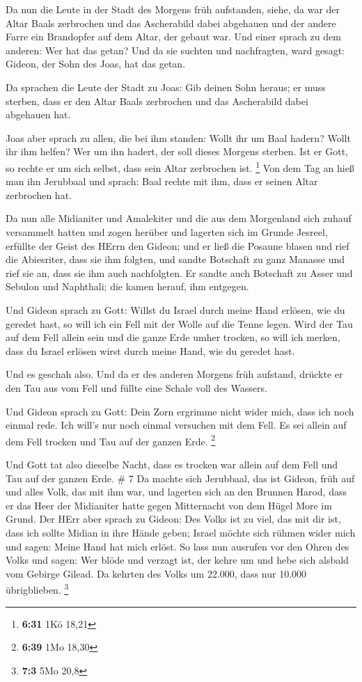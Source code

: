  Da nun die Leute in der Stadt des Morgens früh aufstanden,
siehe, da war der Altar Baals zerbrochen und das Ascherabild dabei
abgehauen und der andere Farre ein Brandopfer auf dem Altar, der gebaut
war.  Und einer sprach zu dem anderen: Wer hat das getan?
Und da sie suchten und nachfragten, ward gesagt: Gideon, der Sohn des
Joas, hat das getan.

 Da sprachen die Leute der Stadt zu Joas: Gib deinen Sohn
heraus; er muss sterben, dass er den Altar Baals zerbrochen und das
Ascherabild dabei abgehauen hat.

 Joas aber sprach zu allen, die bei ihm standen: Wollt ihr
um Baal hadern? Wollt ihr ihm helfen? Wer um ihn hadert, der soll dieses
Morgens sterben. Ist er Gott, so rechte er um sich selbst, dass sein
Altar zerbrochen ist. \footnote{\textbf{6:31} 1Kö 18,21} 
Von dem Tag an hieß man ihn Jerubbaal und sprach: Baal rechte mit ihm,
dass er seinen Altar zerbrochen hat.

 Da nun alle Midianiter und Amalekiter und die aus dem
Morgenland sich zuhauf versammelt hatten und zogen herüber und lagerten
sich im Grunde Jesreel,  erfüllte der Geist des HErrn den
Gideon; und er ließ die Posaune blasen und rief die Abiesriter, dass sie
ihm folgten,  und sandte Botschaft zu ganz Manasse und rief
sie an, dass sie ihm auch nachfolgten. Er sandte auch Botschaft zu Asser
und Sebulon und Naphthali; die kamen herauf, ihm entgegen.

 Und Gideon sprach zu Gott: Willst du Israel durch meine
Hand erlösen, wie du geredet hast,  so will ich ein Fell
mit der Wolle auf die Tenne legen. Wird der Tau auf dem Fell allein sein
und die ganze Erde umher trocken, so will ich merken, dass du Israel
erlösen wirst durch meine Hand, wie du geredet hast.

 Und es geschah also. Und da er des anderen Morgens früh
aufstand, drückte er den Tau aus vom Fell und füllte eine Schale voll
des Wassers.

 Und Gideon sprach zu Gott: Dein Zorn ergrimme nicht wider
mich, dass ich noch einmal rede. Ich will's nur noch einmal versuchen
mit dem Fell. Es sei allein auf dem Fell trocken und Tau auf der ganzen
Erde. \footnote{\textbf{6:39} 1Mo 18,30}

 Und Gott tat also dieselbe Nacht, dass es trocken war
allein auf dem Fell und Tau auf der ganzen Erde. \# 7  Da
machte sich Jerubbaal, das ist Gideon, früh auf und alles Volk, das mit
ihm war, und lagerten sich an den Brunnen Harod, dass er das Heer der
Midianiter hatte gegen Mitternacht von dem Hügel More im Grund.
 Der HErr aber sprach zu Gideon: Des Volks ist zu viel, das
mit dir ist, dass ich sollte Midian in ihre Hände geben; Israel möchte
sich rühmen wider mich und sagen: Meine Hand hat mich erlöst.
 So lass nun ausrufen vor den Ohren des Volks und sagen: Wer
blöde und verzagt ist, der kehre um und hebe sich alsbald vom Gebirge
Gilead. Da kehrten des Volks um 22.000, dass nur 10.000 übrigblieben.
\footnote{\textbf{7:3} 5Mo 20,8}


